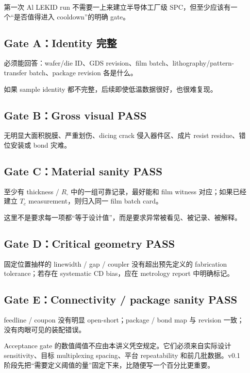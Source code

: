 第一次 Al LEKID run 不需要一上来建立半导体工厂级 SPC，但至少应该有一个“是否值得进入 cooldown”的明确 gate。

\subsection{Gate A：Identity 完整}

必须能回答：wafer/die ID、GDS revision、film batch、lithography/pattern-transfer batch、package revision 各是什么。

如果 sample identity 都不完整，后续即使低温数据很好，也很难复现。

\subsection{Gate B：Gross visual PASS}

无明显大面积脱膜、严重划伤、dicing crack 侵入器件区、成片 resist residue、错位安装或 bond 灾难。

\subsection{Gate C：Material sanity PASS}

至少有 thickness / $R_\square$ 中的一组可靠记录，最好能和 film witness 对应；如果已经建立 $T_c$ measurement，则归入同一 film batch card。

这里不是要求每一项都“等于设计值”，而是要求异常被看见、被记录、被解释。

\subsection{Gate D：Critical geometry PASS}

固定位置抽样的 linewidth / gap / coupler 没有超出预先定义的 fabrication tolerance；若存在 systematic CD bias，应在 metrology report 中明确标记。

\subsection{Gate E：Connectivity / package sanity PASS}

feedline / coupon 没有明显 open-short；package / bond map 与 revision 一致；没有肉眼可见的装配错误。

\begin{warningbox}
Acceptance gate 的数值阈值不应由本讲义凭空规定。它们必须来自实际设计 sensitivity、目标 multiplexing spacing、平台 repeatability 和前几批数据。v0.1 阶段先把“需要定义阈值的量”固定下来，比随便写一个百分比更重要。
\end{warningbox}

